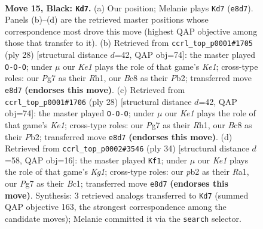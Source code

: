 \documentclass[11pt]{article}
\begin{document}
\clearpage

\begin{figure}[p]\centering
\begin{subfigure}{0.46\textwidth}\centering
\resizebox{\linewidth}{!}{%
\newchessgame
\chessboard[
  setfen={r1b1kb1r/p3n1pp/2pp4/5p2/2N5/3B1P2/PPP3PP/R1B1R1K1 b kq - 5 15},
  showmover=false,
  pgfstyle=straightmove, color=movearrow, markmove={e8-d7}
]}
\caption{}
\end{subfigure}\hfill
\begin{subfigure}{0.46\textwidth}\centering
\resizebox{\linewidth}{!}{%
\newchessgame
\chessboard[
  setfen={r1bbr1k1/ppp2ppp/2n5/8/5BP1/7P/PPP1NP2/R3KB1R w KQ - 0 15},
  showmover=false,
  pgfstyle=straightmove, color=movearrow, markmove={e1-c1}
]}
\caption{}
\end{subfigure}
\\[4pt]
\begin{subfigure}{0.46\textwidth}\centering
\resizebox{\linewidth}{!}{%
\newchessgame
\chessboard[
  setfen={r1bbr1k1/ppp2ppp/2n5/8/5BP1/7P/PPP1NP2/R3KB1R w KQ - 0 15},
  showmover=false,
  pgfstyle=straightmove, color=movearrow, markmove={e1-c1}
]}
\caption{}
\end{subfigure}\hfill
\begin{subfigure}{0.46\textwidth}\centering
\resizebox{\linewidth}{!}{%
\newchessgame
\chessboard[
  setfen={r1b1rnk1/ppp2ppp/8/2b1P3/5P2/2N5/PP2B1PP/R1BR2K1 w - - 1 18},
  showmover=false,
  pgfstyle=straightmove, color=movearrow, markmove={g1-f1}
]}
\caption{}
\end{subfigure}
\caption{\textbf{Move 15, Black: \texttt{Kd7}.} (a) Our position; Melanie plays \texttt{Kd7} (\texttt{e8d7}). Panels (b)--(d) are the retrieved master positions whose correspondence most drove this move (highest QAP objective among those that transfer to it). (b) Retrieved from \texttt{ccrl\_top\_p0001\#1705} (ply 28) [structural distance $d$=42, QAP obj=74]: the master played \texttt{O-O-O}; under $\mu$ our \emph{Ke1} plays the role of that game's \emph{Ke1}; cross-type roles: our \emph{P}g7 as their \emph{R}h1, our \emph{B}c8 as their \emph{P}b2; transferred move \texttt{e8d7} \textbf{(endorses this move)}. (c) Retrieved from \texttt{ccrl\_top\_p0001\#1706} (ply 28) [structural distance $d$=42, QAP obj=74]: the master played \texttt{O-O-O}; under $\mu$ our \emph{Ke1} plays the role of that game's \emph{Ke1}; cross-type roles: our \emph{P}g7 as their \emph{R}h1, our \emph{B}c8 as their \emph{P}b2; transferred move \texttt{e8d7} \textbf{(endorses this move)}. (d) Retrieved from \texttt{ccrl\_top\_p0002\#3546} (ply 34) [structural distance $d$=58, QAP obj=16]: the master played \texttt{Kf1}; under $\mu$ our \emph{Ke1} plays the role of that game's \emph{Kg1}; cross-type roles: our \emph{p}b2 as their \emph{R}a1, our \emph{P}g7 as their \emph{B}c1; transferred move \texttt{e8d7} \textbf{(endorses this move)}. Synthesis: 3 retrieved analogs transferred to \texttt{Kd7} (summed QAP objective 163, the strongest correspondence among the candidate moves); Melanie committed it via the \texttt{search} selector.}
\label{fig:thought-m29}
\end{figure}
\end{document}
